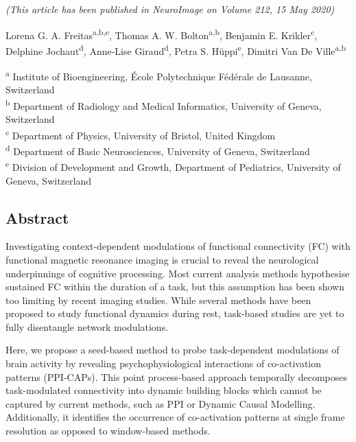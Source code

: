 \begin{center}
 \textit{(This article has been published in NeuroImage on Volume 212, 15 May 2020)}
 
Lorena G. A. Freitas\textsuperscript{a,b,e}, 
Thomas A. W. Bolton\textsuperscript{a,b},  
Benjamin E. Krikler\textsuperscript{c}, 
Delphine Jochaut\textsuperscript{d}, 
Anne-Lise Giraud\textsuperscript{d}, 
Petra S. Hüppi\textsuperscript{e},
Dimitri Van De Ville\textsuperscript{a,b} 

\end{center}
\textsuperscript{a} Institute of Bioengineering, École Polytechnique Fédérale de Lausanne, Switzerland \\
\textsuperscript{b} Department of Radiology and Medical Informatics, University of Geneva, Switzerland \\
\textsuperscript{c} Department of Physics, University of Bristol, United Kingdom \\ 
\textsuperscript{d} Department of Basic Neurosciences, University of Geneva, Switzerland \\
\textsuperscript{e} Division of Development and Growth, Department of Pediatrics, University of Geneva, Switzerland \\


\subsection*{Abstract}

Investigating context-dependent modulations of functional connectivity (FC) with functional magnetic resonance imaging is crucial to reveal the neurological underpinnings of cognitive processing. Most current analysis methods hypothesise sustained FC within the duration of a task, but this assumption has been shown too limiting by recent imaging studies. While several methods have been proposed to study functional dynamics during rest, task-based studies are yet to fully disentangle network modulations. 

Here, we propose a seed-based method to probe task-dependent modulations of brain activity by revealing psychophysiological interactions of co-activation patterns (PPI-CAPs). This point process-based approach temporally decomposes task-modulated connectivity into dynamic building blocks which cannot be captured by current methods, such as PPI or  Dynamic Causal Modelling. Additionally, it identifies the occurrence of co-activation patterns at single frame resolution as opposed to window-based methods. 

